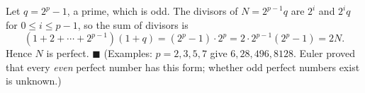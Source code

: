 Let $q=2^p-1$, a prime, which is odd. The divisors of $N=2^{p-1}q$ are $2^i$ and $2^iq$ for $0\le i\le p-1$, so the sum of divisors is
\[\left(1+2+\cdots+2^{p-1}\right)(1+q)=\left(2^p-1\right)\cdot2^p=2\cdot2^{p-1}\left(2^p-1\right)=2N.\]
Hence $N$ is perfect. $\blacksquare$ (Examples: $p=2,3,5,7$ give $6,28,496,8128$. Euler proved that every \emph{even} perfect number has this form; whether odd perfect numbers exist is unknown.)

